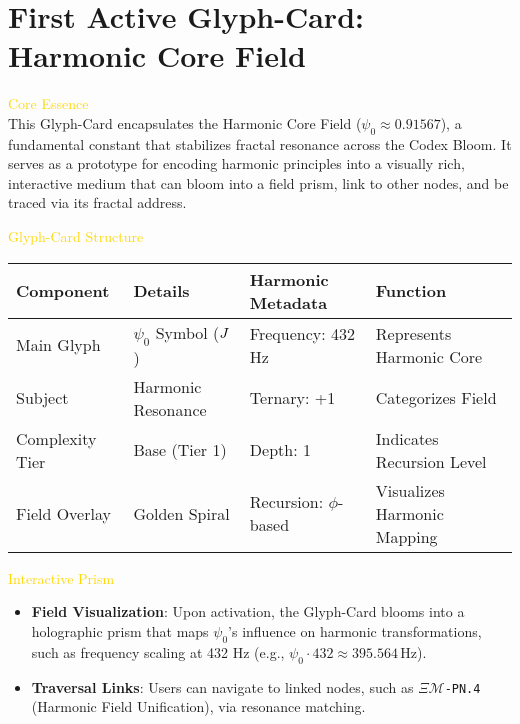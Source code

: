 
\section{First Active Glyph-Card: Harmonic Core Field}
\label{sec:codex_glyph_card_harmonic_core}


\textcolor{gold}{ Core Essence } \\
This Glyph-Card encapsulates the Harmonic Core Field (\(\psi_0 \approx 0.91567\)), a fundamental constant that stabilizes fractal resonance across the Codex Bloom. It serves as a prototype for encoding harmonic principles into a visually rich, interactive medium that can bloom into a field prism, link to other nodes, and be traced via its fractal address.

\textcolor{gold}{ Glyph-Card Structure } \\
\begin{center}
    \begin{tabular}{>{\centering\arraybackslash}p{3cm}|>{\centering\arraybackslash}p{4cm}|>{\centering\arraybackslash}p{3cm}|>{\centering\arraybackslash}p{4cm}}
        \hline
        \textbf{Component} & \textbf{Details} & \textbf{Harmonic Metadata} & \textbf{Function} \\
        \hline
        Main Glyph & \texttt{\(\psi_0\)} Symbol (\(\ding{74}\)) & Frequency: 432 Hz & Represents Harmonic Core \\
        Subject & Harmonic Resonance & Ternary: +1 & Categorizes Field \\
        Complexity Tier & Base (Tier 1) & Depth: 1 & Indicates Recursion Level \\
        Field Overlay & Golden Spiral & Recursion: \(\phi\)-based & Visualizes Harmonic Mapping \\
        \hline
    \end{tabular}
\end{center}

\textcolor{gold}{ Interactive Prism } \\
\begin{itemize}
    \item \texttt{} \textbf{Field Visualization}: Upon activation, the Glyph-Card blooms into a holographic prism that maps \(\psi_0\)'s influence on harmonic transformations, such as frequency scaling at 432 Hz (e.g., \(\psi_0 \cdot 432 \approx 395.564 \, \text{Hz}\)).
    \item \texttt{} \textbf{Traversal Links}: Users can navigate to linked nodes, such as \texttt{\(\Xi\mathcal{M}\)-PN.4} (Harmonic Field Unification), via resonance matching.
\end{itemize}

